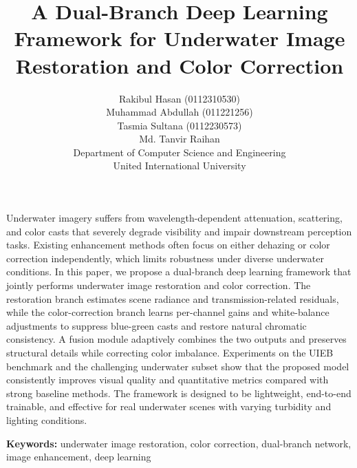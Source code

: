 \documentclass[10pt, twocolumn]{article}
\title{\textbf{A Dual-Branch Deep Learning Framework for Underwater Image Restoration and Color Correction}}
\author{
    Rakibul Hasan (0112310530) \\
    Muhammad Abdullah (011221256) \\
    Tasmia Sultana (0112230573) \\
    Md. Tanvir Raihan \\
    \small Department of Computer Science and Engineering \\
    \small United International University
}
\date{}
\begin{document}
\maketitle

\begin{onecolabstract}
Underwater imagery suffers from wavelength-dependent attenuation, scattering, and color casts that severely degrade visibility and impair downstream perception tasks. Existing enhancement methods often focus on either dehazing or color correction independently, which limits robustness under diverse underwater conditions. In this paper, we propose a dual-branch deep learning framework that jointly performs underwater image restoration and color correction. The restoration branch estimates scene radiance and transmission-related residuals, while the color-correction branch learns per-channel gains and white-balance adjustments to suppress blue-green casts and restore natural chromatic consistency. A fusion module adaptively combines the two outputs and preserves structural details while correcting color imbalance. Experiments on the UIEB benchmark and the challenging underwater subset show that the proposed model consistently improves visual quality and quantitative metrics compared with strong baseline methods. The framework is designed to be lightweight, end-to-end trainable, and effective for real underwater scenes with varying turbidity and lighting conditions.
\end{onecolabstract}

\noindent\textbf{Keywords:} underwater image restoration, color correction, dual-branch network, image enhancement, deep learning








\end{document}
